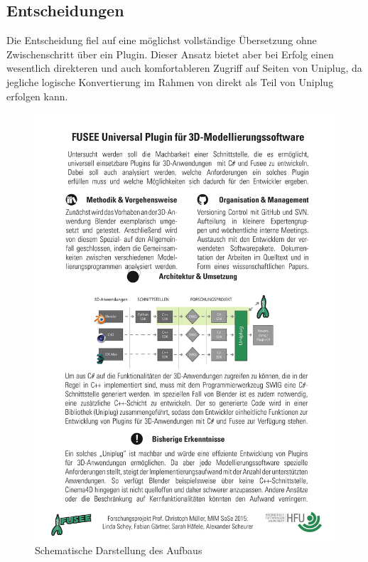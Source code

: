 \subsection{Entscheidungen}
Die Entscheidung fiel auf eine möglichst vollständige Übersetzung ohne Zwischenschritt über ein Plugin. Dieser Ansatz bietet aber bei Erfolg einen wesentlich direkteren und auch komfortableren Zugriff auf Seiten von Uniplug, da jegliche logische Konvertierung im Rahmen von \CS direkt als Teil von Uniplug erfolgen kann.

\begin{figure}[htbp]
\center
\includegraphics[width=1\textwidth]{images/aufbau}
\caption{Schematische Darstellung des Aufbaus}
\label{fig:aufbau}
\end{figure}